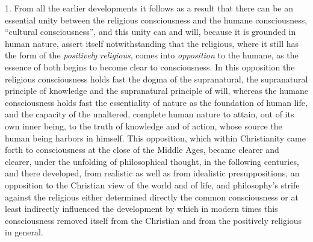 \documentclass[12pt,a4paper,openany]{book}
\newcommand{\opage}[1]{\marginnote{\footnotesize\textit{[#1]}}}
\begin{document}
1. From all the earlier developments it follows as a result that there can be an
essential unity between the religious consciousness and the humane consciousness,
\setcounter{footnote}{0}%
\opage{215}``cultural consciousness'', and this unity can and will, because it is grounded in human
nature, assert itself notwithstanding that the religious, where it still has the form
of the \emph{positively religious}, comes into \emph{opposition} to the humane, as the
essence of both begins to become clear to consciousness. In this opposition the
religious consciousness holds fast the dogma of the supranatural, the supranatural
principle of knowledge and the supranatural principle of will, whereas the humane
consciousness holds fast the essentiality of nature as the foundation of human life,
and the capacity of the unaltered, complete human nature to attain, out of its own
inner being, to the truth of knowledge and of action, whose source the human being
harbors in himself. This opposition, which within Christianity came forth to
consciousness at the close of the Middle Ages, became clearer and clearer, under the
unfolding of philosophical thought, in the following centuries, and there developed,
from realistic as well as from idealistic presuppositions, an opposition to the
Christian view of the world and of life, and philosophy's strife against the religious
either determined directly the common consciousness or at least indirectly influenced
the development by which in modern times this consciousness removed itself from the
Christian and from the positively religious in general.
\end{document}
